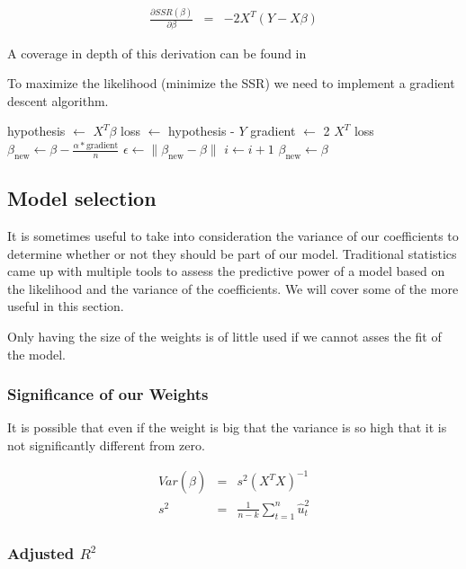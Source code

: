 \documentclass[conference]{IEEEtran}\usepackage[]{graphicx}\usepackage[]{color}
\begin{document}
\begin{eqnarray*}
  \frac{\partial SSR(\beta)}{\partial \beta} &=& -2 X^T (Y-X \beta)
\end{eqnarray*}

A coverage in depth of this derivation can be found in
\cite{davidson2004econometric}

To maximize the likelihood (minimize the SSR) we need to implement a gradient
descent algorithm. 

\begin{algorithmic}
  \State hypothesis $\leftarrow$ $X^T \beta$
  \State loss $\leftarrow$ hypothesis - $Y$
  \State gradient $\leftarrow$ 2 $X^T$ loss
  \State $\beta_{\text{new}} \leftarrow \beta - \frac{\alpha *
    \text{gradient}}{n}$  
  \State $\epsilon \leftarrow \| \beta_{\text{new}} - \beta \| $ 
  \State $i \leftarrow i + 1$
  \State $\beta_{\text{new}} \leftarrow \beta$
  \EndWhile
\end{algorithmic}

\subsection{Model selection}

It is sometimes useful to take into consideration the variance of our
coefficients to determine whether or not they should be part of our model.
Traditional statistics came up with multiple tools to assess the predictive
power of a model based on the likelihood and the variance of the coefficients.
We will cover some of the more useful in this section.

Only having the size of the weights is of little used if we cannot asses the fit
of the model.

\subsubsection{Significance of our Weights}

It is possible that even if the weight is big that the variance is so high that
it is not significantly different from zero.

\begin{eqnarray*}
  Var(\hat{\beta}) &=& s^2 (X^TX)^{-1} \\
  s^2 &=& \frac{1}{n-k} \sum_{t=1}^n \hat{u}_t^2
 \end{eqnarray*}
\cite{davidson2004econometric}
\subsubsection{Adjusted $R^2$}
\end{document}
